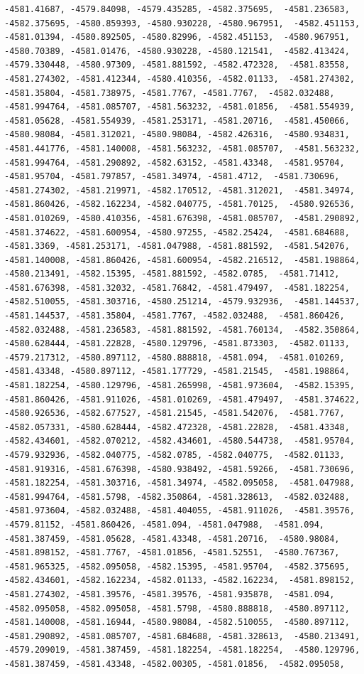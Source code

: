 \documentclass[
]{article}
\begin{document}
\begin{verbatim}
-4581.41687, -4579.84098, -4579.435285, -4582.375695,  -4581.236583, -4582.375695, -4580.859393, -4580.930228, -4580.967951,  -4582.451153, -4581.01394, -4580.892505, -4580.82996, -4582.451153,  -4580.967951, -4580.70389, -4581.01476, -4580.930228, -4580.121541,  -4582.413424, -4579.330448, -4580.97309, -4581.881592, -4582.472328,  -4581.83558, -4581.274302, -4581.412344, -4580.410356, -4582.01133,  -4581.274302, -4581.35804, -4581.738975, -4581.7767, -4581.7767,  -4582.032488, -4581.994764, -4581.085707, -4581.563232, -4581.01856,  -4581.554939, -4581.05628, -4581.554939, -4581.253171, -4581.20716,  -4581.450066, -4580.98084, -4581.312021, -4580.98084, -4582.426316,  -4580.934831, -4581.441776, -4581.140008, -4581.563232, -4581.085707,  -4581.563232, -4581.994764, -4581.290892, -4582.63152, -4581.43348,  -4581.95704, -4581.95704, -4581.797857, -4581.34974, -4581.4712,  -4581.730696, -4581.274302, -4581.219971, -4582.170512, -4581.312021,  -4581.34974, -4581.860426, -4582.162234, -4582.040775, -4581.70125,  -4580.926536, -4581.010269, -4580.410356, -4581.676398, -4581.085707,  -4581.290892, -4581.374622, -4581.600954, -4580.97255, -4582.25424,  -4581.684688, -4581.3369, -4581.253171, -4581.047988, -4581.881592,  -4581.542076, -4581.140008, -4581.860426, -4581.600954, -4582.216512,  -4581.198864, -4580.213491, -4582.15395, -4581.881592, -4582.0785,  -4581.71412, -4581.676398, -4581.32032, -4581.76842, -4581.479497,  -4581.182254, -4582.510055, -4581.303716, -4580.251214, -4579.932936,  -4581.144537, -4581.144537, -4581.35804, -4581.7767, -4582.032488,  -4581.860426, -4582.032488, -4581.236583, -4581.881592, -4581.760134,  -4582.350864, -4580.628444, -4581.22828, -4580.129796, -4581.873303,  -4582.01133, -4579.217312, -4580.897112, -4580.888818, -4581.094,  -4581.010269, -4581.43348, -4580.897112, -4581.177729, -4581.21545,  -4581.198864, -4581.182254, -4580.129796, -4581.265998, -4581.973604,  -4582.15395, -4581.860426, -4581.911026, -4581.010269, -4581.479497,  -4581.374622, -4580.926536, -4582.677527, -4581.21545, -4581.542076,  -4581.7767, -4582.057331, -4580.628444, -4582.472328, -4581.22828,  -4581.43348, -4582.434601, -4582.070212, -4582.434601, -4580.544738,  -4581.95704, -4579.932936, -4582.040775, -4582.0785, -4582.040775,  -4582.01133, -4581.919316, -4581.676398, -4580.938492, -4581.59266,  -4581.730696, -4581.182254, -4581.303716, -4581.34974, -4582.095058,  -4581.047988, -4581.994764, -4581.5798, -4582.350864, -4581.328613,  -4582.032488, -4581.973604, -4582.032488, -4581.404055, -4581.911026,  -4581.39576, -4579.81152, -4581.860426, -4581.094, -4581.047988,  -4581.094, -4581.387459, -4581.05628, -4581.43348, -4581.20716,  -4580.98084, -4581.898152, -4581.7767, -4581.01856, -4581.52551,  -4580.767367, -4581.965325, -4582.095058, -4582.15395, -4581.95704,  -4582.375695, -4582.434601, -4582.162234, -4582.01133, -4582.162234,  -4581.898152, -4581.274302, -4581.39576, -4581.39576, -4581.935878,  -4581.094, -4582.095058, -4582.095058, -4581.5798, -4580.888818,  -4580.897112, -4581.140008, -4581.16944, -4580.98084, -4582.510055,  -4580.897112, -4581.290892, -4581.085707, -4581.684688, -4581.328613,  -4580.213491, -4579.209019, -4581.387459, -4581.182254, -4581.182254,  -4580.129796, -4581.387459, -4581.43348, -4582.00305, -4581.01856,  -4582.095058, 
\end{verbatim}
\end{document}
